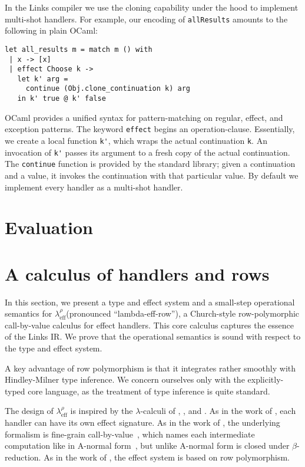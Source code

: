 \documentclass[mscres,cdtppar,twoside,openright,logo,rightchapter,normalheadings]{infthesis}
\theoremstyle{definition}
\newcommand{\Calc}{\ensuremath{\lambda_{\text{eff}}^\rho}\xspace}
\begin{document}
In the Links compiler we use the cloning capability under the hood to implement
multi-shot handlers. For example, our encoding of \lstinline$allResults$
amounts to the following in plain OCaml:
\begin{lstlisting}[style=ocaml]
let all_results m = match m () with
 | x -> [x]
 | effect Choose k -> 
   let k' arg = 
     continue (Obj.clone_continuation k) arg 
   in k' true @ k' false
\end{lstlisting}
OCaml provides a unified syntax for pattern-matching on regular, effect, and
exception patterns. The keyword \lstinline[style=ocaml]$effect$ begins an
operation-clause. Essentially, we create a local function \lstinline$k'$, which
wraps the actual continuation \lstinline$k$. An invocation of \lstinline$k'$
passes its argument to a fresh copy of the actual continuation. The
\lstinline$continue$ function is provided by the standard library; given a
continuation and a value, it invokes the continuation with that particular
value. By default we implement every handler as a multi-shot handler.

\chapter{Evaluation}

\chapter{A calculus of handlers and rows}
\label{sec:lambe-eff-row}

In this section, we present a type and effect system and a small-step
operational semantics for \Calc (pronounced ``lambda-eff-row''), a
Church-style row-polymorphic call-by-value calculus for effect
handlers.
%
This core calculus captures the essence of the Links IR.
%
We prove that the operational semantics is sound with respect to the
type and effect system.

A key advantage of row polymorphism is that it integrates rather
smoothly with Hindley-Milner type inference. We concern ourselves only
with the explicitly-typed core language, as the treatment of type
inference is quite standard.

The design of \Calc is inspired by the $\lambda$-calculi of
\citet{Kammar2013}, \citet{Pretnar2015}, and \citet{Lindley2012}.
%
As in the work of \citet{Kammar2013}, each handler can have its own
effect signature. As in the work of \citet{Pretnar2015}, the
underlying formalism is fine-grain call-by-value~\cite{LevyPT03},
which names each intermediate computation like in A-normal
form~\cite{Flanagan1993}, but unlike A-normal form is closed under
$\beta$-reduction. As in the work of \citet{Lindley2012}, the effect
system is based on row polymorphism.
\end{document}
